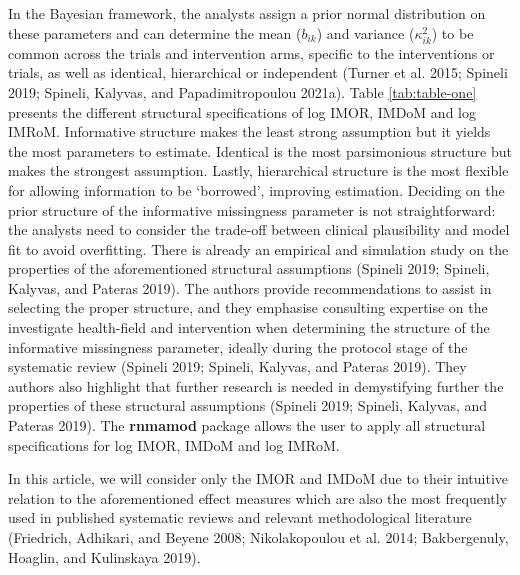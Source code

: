 In the Bayesian framework, the analysts assign a prior normal distribution on these
parameters and can determine the mean (\(b_{ik}\)) and variance (\(\kappa^{2}_{ik}\))
to be common across the trials and intervention arms, specific to the interventions or
trials, as well as identical, hierarchical or independent (Turner et al. 2015; Spineli 2019; Spineli, Kalyvas, and Papadimitropoulou 2021a). Table
\ref{tab:table-one} presents the different structural specifications of
log IMOR, IMDoM and log IMRoM. Informative structure makes the least strong assumption
but it yields the most parameters to estimate. Identical is the most parsimonious
structure but makes the strongest assumption. Lastly, hierarchical structure is
the most flexible for allowing information to be `borrowed', improving estimation.
Deciding on the prior structure of the informative missingness parameter is not
straightforward: the analysts need to consider the trade-off between clinical
plausibility and model fit to avoid overfitting. There is already an empirical
and simulation study on the properties of the aforementioned structural assumptions
(Spineli 2019; Spineli, Kalyvas, and Pateras 2019). The authors provide recommendations to assist
in selecting the proper structure, and they emphasise consulting expertise on the
investigate health-field and intervention when determining the structure of the
informative missingness parameter, ideally during the protocol stage of the systematic
review (Spineli 2019; Spineli, Kalyvas, and Pateras 2019). They authors also highlight that further
research is needed in demystifying further the properties of these structural assumptions
(Spineli 2019; Spineli, Kalyvas, and Pateras 2019). The \textbf{rnmamod} package allows the user to
apply all structural specifications for log IMOR, IMDoM and log IMRoM.

In this article, we will consider only the IMOR and IMDoM due to their intuitive
relation to the aforementioned effect measures which are also the most frequently
used in published systematic reviews and relevant methodological literature
(Friedrich, Adhikari, and Beyene 2008; Nikolakopoulou et al. 2014; Bakbergenuly, Hoaglin, and Kulinskaya 2019).


